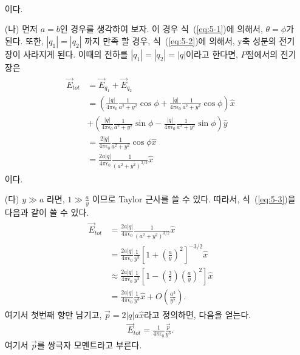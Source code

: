 \documentclass[tightenlines,floatfix,nofootinbib,superscriptaddress,fleqn]{revtex4}
\begin{document}
\begin{itemize}
\begin{align}
  \end{align}
  이다.
\item[(나)] 
먼저 $a=b$인 경우를 생각하여 보자. 이 경우 식~(\ref{eq:5-1})에 의해서,
$\theta=\phi$가 된다. 또한, $\left|q_1\right|=\left|q_2\right|$ 까지 만족 할 경우,
식~(\ref{eq:5-2})에 의해서, y축 성분의 전기장이 사라지게 된다. 이때의 전하를
$\left|q_1\right|=\left|q_2\right|=\left|q\right|$이라고 한다면, 
$P$점에서의 전기장은
\begin{align}\label{eq:5-3}
  \begin{split}
    \vec{E}_{tot}&=\vec{E}_{q_1}+\vec{E}_{q_2}\\
    &=\left(\frac{\left|q\right|}{4\pi\epsilon_0}\frac{1}{a^2+y^2}\cos{\phi}+\frac{\left|q\right|}{4\pi\epsilon_0}\frac{1}{a^2+y^2}\cos{\phi}\right)\hat{x}\\
    &+\left(\frac{\left|q\right|}{4\pi\epsilon_0}\frac{1}{a^2+y^2}\sin{\phi}-\frac{\left|q\right|}{4\pi\epsilon_0}\frac{1}{a^2+y^2}\sin{\phi}\right)\hat{y}\\
    &=\frac{2\left|q\right|}{4\pi\epsilon_0}\frac{1}{a^2+y^2}\cos{\phi}\hat{x}\\
    &=\frac{2a\left|q\right|}{4\pi\epsilon_0}\frac{1}{\left(a^2+y^2\right)^{3/2}}\hat{x}
  \end{split}
\end{align}
이다.
\item[(다)]
	$y \gg a$ 라면, $1 \gg \frac{a}{y}$ 이므로 Taylor 근사를 쓸 수 있다.
  따라서, 식~(\ref{eq:5-3})을 다음과 같이 쓸 수 있다.
  \begin{align}
    \begin{split}
      \vec{E}_{tot}&=\frac{2a\left|q\right|}{4\pi\epsilon_0}\frac{1}{\left(a^2+y^2\right)^{3/2}}\hat{x}\\
      &=\frac{2a\left|q\right|}{4\pi\epsilon_0}\frac{1}{y^3}\left[1+\left(\frac{a}{y}\right)^2\right]^{-3/2}\hat{x}\\
      &\approx\frac{2a\left|q\right|}{4\pi\epsilon_0}\frac{1}{y^3}\left[1-\left(\frac{3}{2}\right)\left(\frac{a}{y}\right)^2\right]\hat{x}\\
      &=\frac{2a\left|q\right|}{4\pi\epsilon_0}\frac{1}{y^3}\hat{x}+O\left(\frac{a^3}{y^5}\right).
    \end{split}
  \end{align}
	여기서 첫번째 항만 남기고, $\vec{p}=2\left|q\right|a\hat{x}$라고
  정의하면, 다음을 얻는다.
  \begin{align}
    \vec{E}_{tot}=\frac{1}{4\pi\epsilon_0}\frac{\vec{p}}{y^3}.
  \end{align}
  여기서 $\vec{p}$를 쌍극자 모멘트라고 부른다.
	\end{itemize}
	
\end{document}
